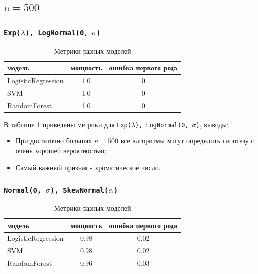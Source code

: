 \documentclass[12pt,a4paper]{report}
\begin{document}
\subsection{$\text{n} = 500$}
\subsubsection{\texttt{Exp($\lambda$), LogNormal(0, $\sigma$)}}
\begin{table}[htbp]
  \centering
  \caption{Метрики разных моделей}
  \label{tab:results_exp_lognormal_500}
  \begin{tabular}{@{} l c c @{}}
    \toprule
    модель & мощность & ошибка первого рода \\
    \midrule
    LogisticRegression & 1.0 & 0 \\
    SVM                & 1.0 & 0 \\
    RandomForest       & 1.0 & 0 \\
    \bottomrule
  \end{tabular}
\end{table}

В таблице \ref{tab:results_exp_lognormal_500} приведены метрики для \texttt{Exp($\lambda$), LogNormal(0, $\sigma$)}, выводы:
\begin{itemize}
    \item При достаточно больших $n = 500$ все алгоритмы могут определить гипотезу с очень хорошей вероятностью;
    \item Самый важный признак - хроматическое число.
\end{itemize}

\subsubsection{\texttt{Normal(0, $\sigma$), SkewNormal($\alpha$)}}
\begin{table}[htbp]
  \centering
  \caption{Метрики разных моделей}
  \label{tab:results_normal_skewnormal_500}
  \begin{tabular}{@{} l c c @{}}
    \toprule
    модель & мощность & ошибка первого рода \\
    \midrule
    LogisticRegression & 0.98 & 0.02 \\
    SVM                & 0.98 & 0.02 \\
    RandomForest       & 0.96 & 0.03 \\
    \bottomrule
  \end{tabular}
\end{table}
\end{document}

